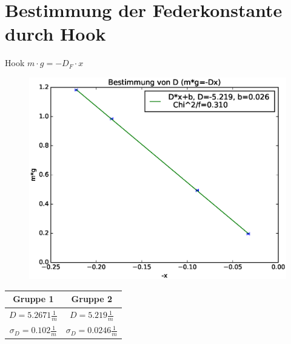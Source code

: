 \documentclass[11pt]{beamer}
\begin{document}
\section{Bestimmung der Federkonstante durch Hook}
\begin{frame}{Hook $m \cdot g = -D_F \cdot x$}


\begin{figure}[H]
\centering
\includegraphics[scale=0.3]{Bilder/Hook_linreg.eps}
\end{figure}

\begin{table}[H]\centering
\begin{tabular}{c|c}
Gruppe 1 & Gruppe 2\\ 
\hline
$D=5.2671 \frac{1}{m}$& $D=5.219 \frac{1}{m}$\\ 
$\sigma_D=0.102 \frac{1}{m}$& $\sigma_D=0.0246 \frac{1}{m}$\\
\end{tabular} 
\end{table}
\end{frame}
\end{document}
